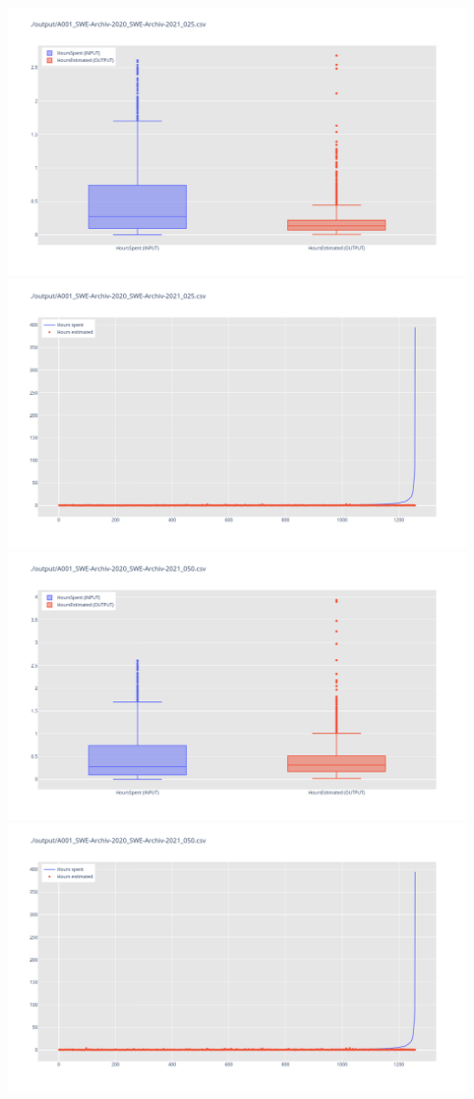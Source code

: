 \includegraphics[width=\textwidth]{Scripts/output/A001_SWE-Archiv-2020_SWE-Archiv-2021_025.csv.png}
\includegraphics[width=\textwidth]{Scripts/output/A001_SWE-Archiv-2020_SWE-Archiv-2021_025.csv.scatter.png}
\includegraphics[width=\textwidth]{Scripts/output/A001_SWE-Archiv-2020_SWE-Archiv-2021_050.csv.png}
\includegraphics[width=\textwidth]{Scripts/output/A001_SWE-Archiv-2020_SWE-Archiv-2021_050.csv.scatter.png}

